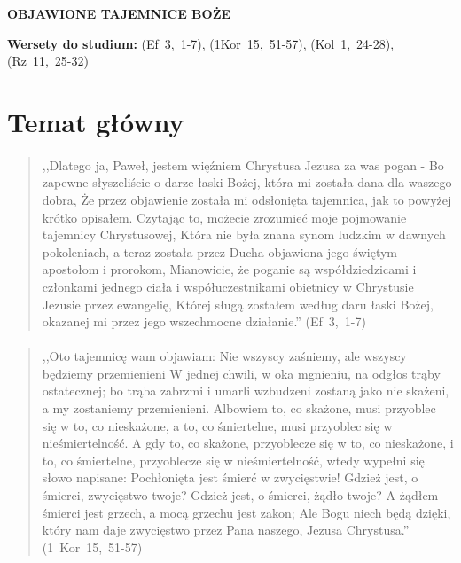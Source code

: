 \documentclass[10pt,a4paper,oneside]{article}
\begin{document}
\centerline{\textbf{\MakeUppercase{Objawione tajemnice Boże}}}
\begin{center}
\textbf{Wersety do studium:} \mbox{(Ef 3, 1-7)}, \mbox{(1Kor 15, 51-57)}, \mbox{(Kol 1, 24-28)}, \mbox{(Rz 11, 25-32)}
\end{center}
\section{Temat główny}
\paragraph{}
\begin{quote}
,,Dlatego ja, Paweł, jestem więźniem Chrystusa Jezusa za was pogan - Bo zapewne słyszeliście o darze łaski Bożej, która mi została dana dla waszego dobra, Że przez objawienie została mi odsłonięta tajemnica, jak to powyżej krótko opisałem. Czytając to, możecie zrozumieć moje pojmowanie tajemnicy Chrystusowej, Która nie była znana synom ludzkim w dawnych pokoleniach, a teraz została przez Ducha objawiona jego świętym apostołom i prorokom, Mianowicie, że poganie są współdziedzicami i członkami jednego ciała i współuczestnikami obietnicy w Chrystusie Jezusie przez ewangelię, Której sługą zostałem według daru łaski Bożej, okazanej mi przez jego wszechmocne działanie.'' \mbox{(Ef 3, 1-7)}
\end{quote}
\paragraph{}
\begin{quote}
,,Oto tajemnicę wam objawiam: Nie wszyscy zaśniemy, ale wszyscy będziemy przemienieni W jednej chwili, w oka mgnieniu, na odgłos trąby ostatecznej; bo trąba zabrzmi i umarli wzbudzeni zostaną jako nie skażeni, a my zostaniemy przemienieni. Albowiem to, co skażone, musi przyoblec się w to, co nieskażone, a to, co śmiertelne, musi przyoblec się w nieśmiertelność. A gdy to, co skażone, przyoblecze się w to, co nieskażone, i to, co śmiertelne, przyoblecze się w nieśmiertelność, wtedy wypełni się słowo napisane: Pochłonięta jest śmierć w zwycięstwie! Gdzież jest, o śmierci, zwycięstwo twoje? Gdzież jest, o śmierci, żądło twoje? A żądłem śmierci jest grzech, a mocą grzechu jest zakon; Ale Bogu niech będą dzięki, który nam daje zwycięstwo przez Pana naszego, Jezusa Chrystusa.'' \mbox{(1 Kor 15, 51-57)}
\end{quote}
\end{document}
